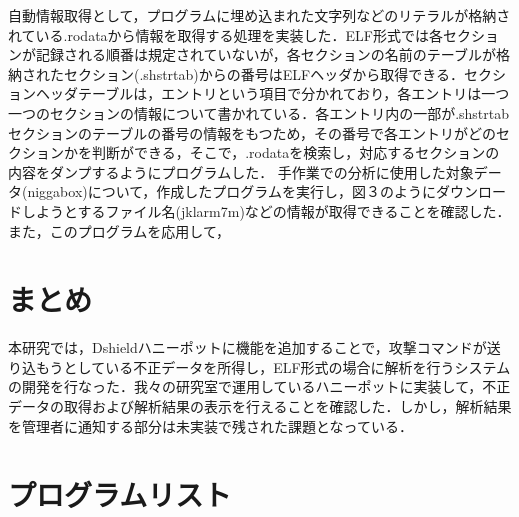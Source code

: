 \documentclass[dvipdfmx]{bta}
\begin{document}
自動情報取得として，プログラムに埋め込まれた文字列などのリテラルが格納されている.rodataから情報を取得する処理を実装した．ELF形式では各セクションが記録される順番は規定されていないが，各セクションの名前のテーブルが格納されたセクション(.shstrtab)からの番号はELFヘッダから取得できる．セクションヘッダテーブルは，エントリという項目で分かれており，各エントリは一つ一つのセクションの情報について書かれている．各エントリ内の一部が.shstrtabセクションのテーブルの番号の情報をもつため，その番号で各エントリがどのセクションかを判断ができる，そこで，.rodataを検索し，対応するセクションの内容をダンプするようにプログラムした．
手作業での分析に使用した対象データ(niggabox)について，作成したプログラムを実行し，図３のようにダウンロードしようとするファイル名(jklarm7m)などの情報が取得できることを確認した．
また，このプログラムを応用して，

\chapter{まとめ}

本研究では，Dshieldハニーポットに機能を追加することで，攻撃コマンドが送り込もうとしている不正データを所得し，ELF形式の場合に解析を行うシステムの開発を行なった．我々の研究室で運用しているハニーポットに実装して，不正データの取得および解析結果の表示を行えることを確認した．しかし，解析結果を管理者に通知する部分は未実装で残された課題となっている．

%



\appendix

\chapter{プログラムリスト}


\end{document}
